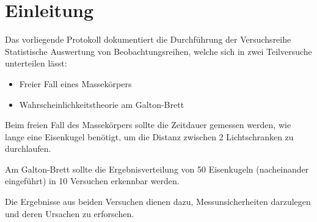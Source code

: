 \section{Einleitung}
Das vorliegende Protokoll dokumentiert die Durchführung der Versuchsreihe \glqq Statistische Auswertung von Beobachtungsreihen\grqq, welche sich in zwei Teilversuche unterteilen lässt:
\begin{itemize}
    \item Freier Fall eines Massekörpers
    \item Wahrscheinlichkeitstheorie am Galton-Brett
\end{itemize} 
Beim freien Fall des Massekörpers sollte die Zeitdauer gemessen werden, wie lange eine Eisenkugel benötigt, um die Distanz zwischen 2 Lichtschranken zu durchlaufen.

Am Galton-Brett sollte die Ergebnisverteilung von 50 Eisenkugeln (nacheinander eingeführt) in 10 Versuchen erkennbar werden.

Die Ergebnisse aus beiden Versuchen dienen dazu, Messunsicherheiten darzulegen und deren Ursachen zu erforschen.